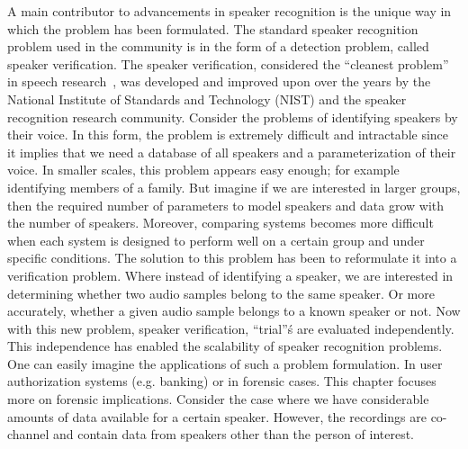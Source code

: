 A main contributor to advancements in speaker recognition is the unique way in which the problem has been formulated. 
The standard speaker recognition problem used in the community is in the form of a detection problem, called speaker verification. 
The speaker verification, considered the ``cleanest problem'' in speech research~\cite{anintroductiontoapplicationindependentevaluationofspeakerrecognitionsystems}, was developed and improved upon over the years by the National Institute of Standards and Technology (NIST) and the speaker recognition research community. 
Consider the problems of identifying speakers by their voice. 
In this form, the problem is extremely difficult and intractable since it implies that we need a database of all speakers and a parameterization of their voice. 
In smaller scales, this problem appears easy enough; for example identifying members of a family. 
But imagine if we are interested in larger groups, then the required number of parameters to model speakers and data grow with the number of speakers. 
Moreover, comparing systems becomes more difficult when each system is designed to perform well on a certain group and under specific conditions. 
The solution to this problem has been to reformulate it into a verification problem. 
Where instead of identifying a speaker, we are interested in determining whether two audio samples belong to the same speaker. 
Or more accurately, whether a given audio sample belongs to a known speaker or not. 
Now with this new problem, speaker verification, ``trial''\'s are evaluated independently. 
This independence has enabled the scalability of speaker recognition problems. 
One can easily imagine the applications of such a problem formulation. 
In user authorization systems (e.g. banking) or in forensic cases. 
This chapter focuses more on forensic implications. 
Consider the case where we have considerable amounts of data available for a certain speaker. 
However, the recordings are co-channel and contain data from speakers other than the person of interest. 

